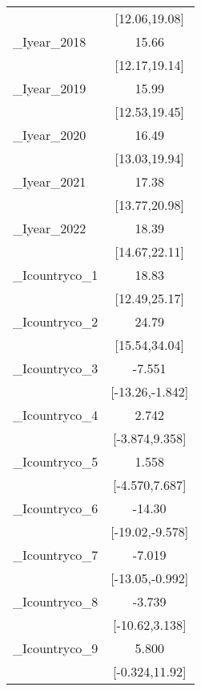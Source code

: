 {\begin{tabular}{l*{1}{c}}
            &         [12.06,19.08]         \\
[1em]
\_Iyear\_2018 &                 15.66\sym{***}\\
            &         [12.17,19.14]         \\
[1em]
\_Iyear\_2019 &                 15.99\sym{***}\\
            &         [12.53,19.45]         \\
[1em]
\_Iyear\_2020 &                 16.49\sym{***}\\
            &         [13.03,19.94]         \\
[1em]
\_Iyear\_2021 &                 17.38\sym{***}\\
            &         [13.77,20.98]         \\
[1em]
\_Iyear\_2022 &                 18.39\sym{***}\\
            &         [14.67,22.11]         \\
[1em]
\_Icountryco\_1&                 18.83\sym{***}\\
            &         [12.49,25.17]         \\
[1em]
\_Icountryco\_2&                 24.79\sym{***}\\
            &         [15.54,34.04]         \\
[1em]
\_Icountryco\_3&                -7.551\sym{**} \\
            &       [-13.26,-1.842]         \\
[1em]
\_Icountryco\_4&                 2.742         \\
            &        [-3.874,9.358]         \\
[1em]
\_Icountryco\_5&                 1.558         \\
            &        [-4.570,7.687]         \\
[1em]
\_Icountryco\_6&                -14.30\sym{***}\\
            &       [-19.02,-9.578]         \\
[1em]
\_Icountryco\_7&                -7.019\sym{*}  \\
            &       [-13.05,-0.992]         \\
[1em]
\_Icountryco\_8&                -3.739         \\
            &        [-10.62,3.138]         \\
[1em]
\_Icountryco\_9&                 5.800         \\
            &        [-0.324,11.92]         \\

\end{tabular}}
